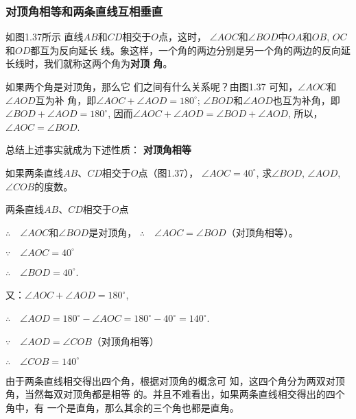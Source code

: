 \subsubsection{对顶角相等和两条直线互相垂直}

如图1.37所示 直线$AB$和$CD$相交于$O$点，这时，
$\angle AOC$和$\angle BOD$中$OA$和$OB$, $OC$和$OD$都互为反向延长
线。象这样，一个角的两边分别是另一个角的两边的反向延
长线时，我们就称这两个角为\textbf{对顶
角}。

如果两个角是对顶角，那么它
们之间有什么关系呢？由图1.37
可知，$\angle AOC$和$\angle AOD$互为补
角，即$\angle AOC+\angle AOD=180^{\circ}$;
$\angle BOD$和$\angle AOD$也互为补角，即$\angle BOD+\angle AOD=180^{\circ}$,
因而$\angle AOC+\angle AOD=\angle BOD+\angle AOD$, 所以，$\angle AOC=\angle BOD$.

总结上述事实就成为下述性质：
\textbf{对顶角相等}

\begin{example}
	如果两条直线$AB$、$CD$相交于$O$点（图1.37），
$\angle AOC=40^{\circ}$, 求$\angle BOD$, $\angle AOD$, $\angle COB$的度数。
\end{example}

\begin{figure}[htp]
	\centering
{}
	\caption{}
\end{figure}

\begin{solution}
	两条直线$AB$、$CD$相交于$O$点

$\therefore\quad \angle AOC$和$\angle BOD$是对顶角，
$\therefore\quad \angle AOC=\angle BOD$（对顶角相等）。

$\because\quad \angle AOC=40^{\circ}$

$\therefore\quad \angle BOD=40^{\circ}$.

又：$\angle AOC+\angle AOD=180^{\circ}$,

$\therefore\quad \angle AOD=180^{\circ}-\angle AOC=180^{\circ}-40^{\circ}=140^{\circ}$.

$\because\quad \angle AOD=\angle COB$（对顶角相等）

$\therefore\quad \angle COB=140^{\circ}$
\end{solution}


由于两条直线相交得出四个角，根据对顶角的概念可
知，这四个角分为两双对顶角，当然每双对顶角都是相等
的。并且不难看出，如果两条直线相交得出的四个角中，有
一个是直角，那么其余的三个角也都是直角。

